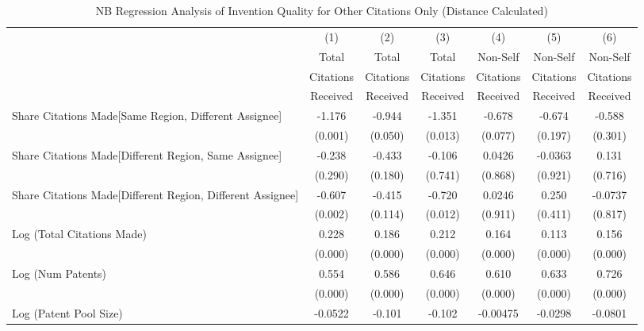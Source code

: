 \begin{table}[htbp]\centering
\caption{NB Regression Analysis of Invention Quality for Other Citations Only (Distance Calculated) \label{o.model123192021}}
\scriptsize
\singlespacing
\begin{tabular}{l*{6}{c}}
\hline\hline
                &\multicolumn{1}{c}{(1)}&\multicolumn{1}{c}{(2)}&\multicolumn{1}{c}{(3)}&\multicolumn{1}{c}{(4)}&\multicolumn{1}{c}{(5)}&\multicolumn{1}{c}{(6)}\\
                &\multicolumn{1}{c}{Total}&\multicolumn{1}{c}{Total}&\multicolumn{1}{c}{Total}&\multicolumn{1}{c}{Non-Self}&\multicolumn{1}{c}{Non-Self}&\multicolumn{1}{c}{Non-Self}\\
                &\multicolumn{1}{c}{Citations}&\multicolumn{1}{c}{Citations}&\multicolumn{1}{c}{Citations}&\multicolumn{1}{c}{Citations}&\multicolumn{1}{c}{Citations}&\multicolumn{1}{c}{Citations}\\
                 &\multicolumn{1}{c}{Received}&\multicolumn{1}{c}{Received}&\multicolumn{1}{c}{Received}&\multicolumn{1}{c}{Received}&\multicolumn{1}{c}{Received}&\multicolumn{1}{c}{Received}\\
\hline
Share Citations Made[Same Region, Different Assignee]&   -1.176&   -0.944&   -1.351&   -0.678&   -0.674&   -0.588\\
                &  (0.001)&  (0.050)&  (0.013)&  (0.077)&  (0.197)&  (0.301)\\
Share Citations Made[Different Region, Same Assignee]&   -0.238&   -0.433&   -0.106&   0.0426&  -0.0363&    0.131\\
                &  (0.290)&  (0.180)&  (0.741)&  (0.868)&  (0.921)&  (0.716)\\
Share Citations Made[Different Region, Different Assignee]&   -0.607&   -0.415&   -0.720&   0.0246&    0.250&  -0.0737\\
                &  (0.002)&  (0.114)&  (0.012)&  (0.911)&  (0.411)&  (0.817)\\
Log (Total Citations Made)&    0.228&    0.186&    0.212&    0.164&    0.113&    0.156\\
                &  (0.000)&  (0.000)&  (0.000)&  (0.000)&  (0.000)&  (0.000)\\
Log (Num Patents)&    0.554&    0.586&    0.646&    0.610&    0.633&    0.726\\
                &  (0.000)&  (0.000)&  (0.000)&  (0.000)&  (0.000)&  (0.000)\\
Log (Patent Pool Size)&  -0.0522&   -0.101&   -0.102& -0.00475&  -0.0298&  -0.0801\\

\end{tabular}
\end{table}
